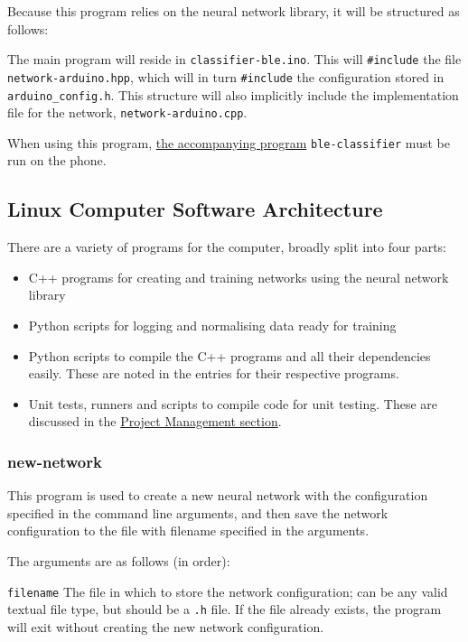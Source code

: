 \documentclass[a4paper]{article}
\begin{document}
Because this program relies on the neural network library, it will be structured as follows:

The main program will reside in \lstinline{classifier-ble.ino}. This will \lstinline{#include} the file \lstinline{network-arduino.hpp}, which will in turn \lstinline{#include} the configuration stored in \lstinline{arduino_config.h}. 
This structure will also implicitly include the implementation file for the network, \lstinline{network-arduino.cpp}.

When using this program, \hyperref[subsubsec:dc_asa_classifier]{the accompanying program} \lstinline{ble-classifier} must be run on the phone.

\subsection{Linux Computer Software Architecture}%
\label{subsec:dc_csa}

There are a variety of programs for the computer, broadly split into four parts:

\begin{itemize}
\item C++ programs for creating and training networks using the neural network library
\item Python scripts for logging and normalising data ready for training
\item Python scripts to compile the C++ programs and all their dependencies easily. These are noted in the entries for their respective programs.
\item Unit tests, runners and scripts to compile code for unit testing. These are discussed in the \hyperref[subsec:pp_testing]{Project Management section}.
\end{itemize}

\subsubsection{new-network}%
\label{subsubsec:dc_csa_newnetwork}

This program is used to create a new neural network with the configuration specified in the command line arguments, and then save the network configuration to the file with filename specified in the arguments.

The arguments are as follows (in order):

\lstinline{filename} The file in which to store the network configuration; can be any valid textual file type, but should be a \lstinline{.h} file. If the file already exists, the program will exit without creating the new network configuration.
\end{document}
